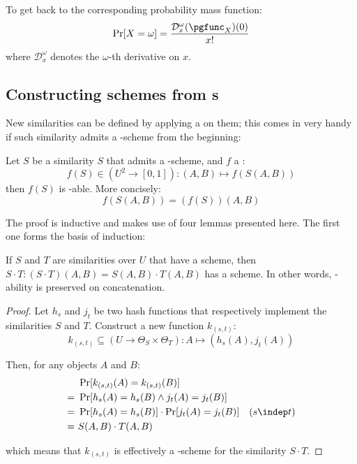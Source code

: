 To get back to the corresponding probability mass function:
\[
    \Pr[X = \omega] = \frac{\mathcal{D}_x^\omega(\pgfunc_X)(0)}{x!}
\]
where $\mathcal{D}_x^\omega$ denotes the $\omega$-th derivative on $x$.


\subsection{Constructing schemes from \pgf{}s}

New similarities can be defined by applying a \pgf on them; this comes in very handy if such similarity admits a \lsh-scheme from the beginning:



\begin{theorem} \label{thm:pgfcompsim}
    Let $S$ be a similarity $S$ that admits a \lsh-scheme, and $f$ a \pgf:
    \[
        f(S) \in (U^2 \to [0, 1]) : (A, B) \mapsto f(S(A, B))
    \]
    then $f(S)$ is \lsh-able. More concisely:
    \[
        f(S(A, B)) = (f(S)) (A, B)
    \]
\end{theorem}


The proof is inductive and makes use of four lemmas presented here. The first one forms the basis of induction:


\begin{lemma}\label{lem:pgfcomp}
    If $S$ and $T$ are similarities over $U$ that have a scheme, then $S \cdot T : (S \cdot T)(A, B) = S(A, B) \cdot T(A, B)$ has a scheme. In other words, \lsh-ability is preserved on concatenation.
\end{lemma}

\begin{proof}
    Let $h_s$ and $j_t$ be two hash functions that respectively implement the similarities $S$ and $T$. Construct a new function $k_{(s, t)}$:
    \[
        k_{(s, t)} \subseteq (U \to \Theta_S \times \Theta_T) : A \mapsto (h_s(A), j_t(A))
    \]

    Then, for any objects $A$ and $B$:
    \begin{align*}
         &\ \Pr[k_{(s, t)}(A) = k_{(s, t)}(B)]              & \\
        =&\ \Pr[h_s(A) = h_s(B) \wedge j_t(A) = j_t(B)]     & \\
        =&\ \Pr[h_s(A) = h_s(B)] \cdot \Pr[j_t(A) = j_t(B)] & (s \indep t) \\
        =&\ S(A, B) \cdot T(A, B)                           &
    \end{align*}

    which means that $k_{(s, t)}$ is effectively a \lsh-scheme for the similarity $S \cdot T$.
\end{proof}

